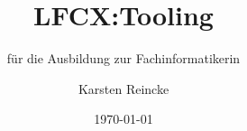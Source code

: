 \documentclass[]{beamer}
\title{LFCX:Tooling}
\subtitle{für die Ausbildung zur Fachinformatikerin}
\institute{GS-LDK}
\author{Karsten Reincke}
\date{\today}
\def\cfgGl{../../../cfg.gl/}
\begin{document}

\begin{frame}
  \titlepage
\end{frame}






\logo{}
\newpage



%
\end{document}
